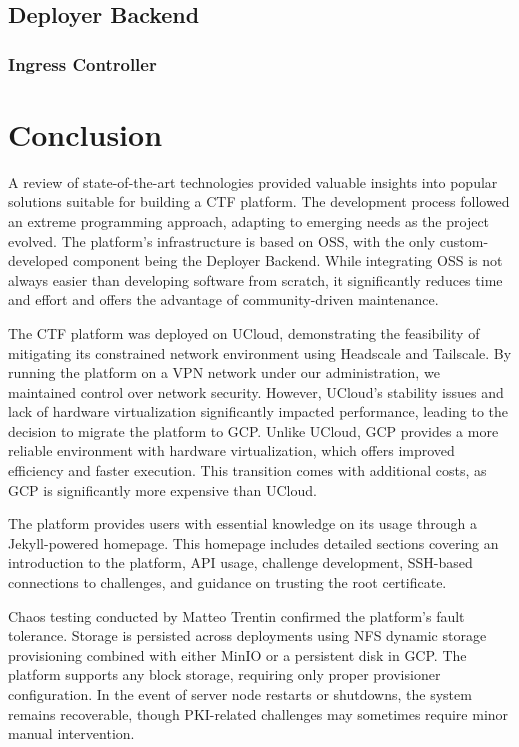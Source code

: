 \section{Deployer Backend}

\subsection{Ingress Controller}

\chapter{Conclusion}
A review of state-of-the-art technologies provided valuable insights into popular solutions suitable for building a CTF platform. The development process followed an extreme programming approach, adapting to emerging needs as the project evolved. The platform's infrastructure is based on OSS, with the only custom-developed component being the Deployer Backend. While integrating OSS is not always easier than developing software from scratch, it significantly reduces time and effort and offers the advantage of community-driven maintenance.

The CTF platform was deployed on UCloud, demonstrating the feasibility of mitigating its constrained network environment using Headscale and Tailscale. By running the platform on a VPN network under our administration, we maintained control over network security. However, UCloud's stability issues and lack of hardware virtualization significantly impacted performance, leading to the decision to migrate the platform to GCP. Unlike UCloud, GCP provides a more reliable environment with hardware virtualization, which offers improved efficiency and faster execution. This transition comes with additional costs, as GCP is significantly more expensive than UCloud.

The platform provides users with essential knowledge on its usage through a Jekyll-powered homepage. This homepage includes detailed sections covering an introduction to the platform, API usage, challenge development, SSH-based connections to challenges, and guidance on trusting the root certificate.

Chaos testing conducted by Matteo Trentin confirmed the platform's fault tolerance. Storage is persisted across deployments using NFS dynamic storage provisioning combined with either MinIO or a persistent disk in GCP. The platform supports any block storage, requiring only proper provisioner configuration. In the event of server node restarts or shutdowns, the system remains recoverable, though PKI-related challenges may sometimes require minor manual intervention.

